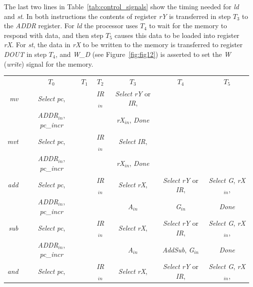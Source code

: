 \documentclass[epsfig,10pt,fullpage]{article} \addtolength{\textwidth}{1.5in}
\begin{document}
\begin{enumerate}
The last two lines in Table~\ref{tab:control_signals} show the timing needed for {\it ld}
and {\it st}. In both instructions the contents of register {\it rY} is
transferred in step $T_3$ to the {\it ADDR} register. For {\it ld} the processor uses 
$T_4$ to wait for the memory to respond with data, and then step
$T_5$ causes this data to
be loaded into register {\it rX}. For {\it st}, the data in
{\it rX} to be written to the
memory is transferred to register {\it DOUT} in step $T_4$, and {\it W\_D} (see 
Figure~\ref{fig:fig12}) is asserted to set the {\it W} ({\it write}) signal for the memory.  

\begin{table}[H]
\begin{center}
\begin{tabular}{r|c|c|c|c|c|c|}
\multicolumn{1}{c}{~} & \multicolumn{1}{c}{$T_0$} & \multicolumn{1}{c}{$T_1$} & \multicolumn{1}{c}{$T_2$} & \multicolumn{1}{c}{$T_3$} & \multicolumn{1}{c}{$T_4$} & \multicolumn{1}{c}{$T_5$} \rule[-0.075in]{0in}{0.25in}\\ \cline{2-7}
{\it mv~} & {\it Select} {\it pc}, & ~ & {\it IR}$_{in}$ & \rule[-0.075in]{0in}{0.25in}{\it Select} {\it rY} or {\it IR}, &  &  \\
~ & {\it ADDR}$_{in}$, {\it pc\_incr} & ~ & ~ & {\it rX$_{in}$}, {\it Done} &  &  \\ \cline{2-7}
{\it mvt~} & {\it Select} {\it pc}, & ~ & {\it IR}$_{in}$ & \rule[-0.075in]{0in}{0.25in}{\it Select} {\it IR}, &  &  \\
~ & {\it ADDR}$_{in}$, {\it pc\_incr} & ~ & ~ & {\it rX$_{in}$}, {\it Done} &  &  \\ \cline{2-7}
\rule[-0.075in]{0in}{0.25in}{\it add~} & {\it Select} {\it
pc}, & ~ & {\it IR}$_{in}$ & {\it Select} {\it rX}, & {\it Select} {\it rY} or {\it IR}, & {\it Select G}, {\it rX$_{in}$}, \\
~ & {\it ADDR}$_{in}$, {\it pc\_incr} & ~ & ~ & {\it A$_{in}$} &  {\it G$_{in}$} & {\it Done} \\
\cline{2-7}
\rule[-0.075in]{0in}{0.25in}{\it sub~} & {\it Select} {\it
pc}, & ~ & {\it IR}$_{in}$ & {\it Select} {\it rX}, & {\it Select} {\it rY} or {\it IR}, & {\it Select G}, {\it rX$_{in}$}, \\
~ & {\it ADDR}$_{in}$, {\it pc\_incr} & ~ & ~ & {\it A$_{in}$} &  {\it AddSub}, {\it G$_{in}$} & {\it Done} \\
\cline{2-7}
\rule[-0.075in]{0in}{0.25in}{\it and~} & {\it Select} {\it
pc}, & ~ & {\it IR}$_{in}$ & {\it Select} {\it rX}, & {\it Select} {\it rY} or {\it IR}, & {\it Select G}, {\it rX$_{in}$}, \\

\end{tabular}
\end{center}
\end{table}
\end{enumerate}
\end{document}

